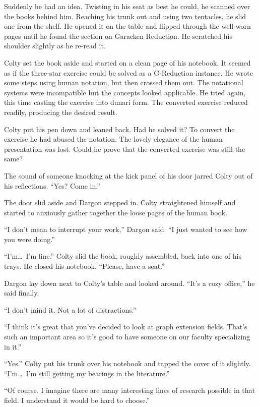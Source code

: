 Suddenly he had an idea. Twisting in his seat as best he could, he scanned over the books behind
him. Reaching his trunk out and using two tentacles, he slid one from the shelf. He opened it on
the table and flipped through the well worn pages until he found the section on Garacken
Reduction. He scratched his shoulder slightly as he re-read it.

Colty set the book aside and started on a clean page of his notebook. It seemed as if the
three-star exercise could be solved as a G-Reduction instance. He wrote some steps using human
notation, but then crossed them out. The notational systems were incompatible but the concepts
looked applicable. He tried again, this time casting the exercise into dunari form. The
converted exercise reduced readily, producing the desired result.

Colty put his pen down and leaned back. Had he solved it? To convert the exercise he had abused
the notation. The lovely elegance of the human presentation was lost. Could he prove that the
converted exercise was still the same?

The sound of someone knocking at the kick panel of his door jarred Colty out of his reflections.
``Yes? Come in.''

The door slid aside and Dargon stepped in. Colty straightened himself and started to anxiously
gather together the loose pages of the human book.

``I don't mean to interrupt your work,'' Dargon said. ``I just wanted to see how you were
doing.''

``I'm\ldots\ I'm fine.'' Colty slid the book, roughly assembled, back into one of his trays. He
closed his notebook. ``Please, have a seat.''

Dargon lay down next to Colty's table and looked around. ``It's a cozy office,'' he said
finally.

``I don't mind it. Not a lot of distractions.''

``I think it's great that you've decided to look at graph extension fields. That's such an
important area so it's good to have someone on our faculty specializing in it.''

``Yes.'' Colty put his trunk over his notebook and tapped the cover of it slightly. ``I'm\ldots\
I'm still getting my bearings in the literature.''

``Of course. I imagine there are many interesting lines of research possible in that field. I
understand it would be hard to choose.''

